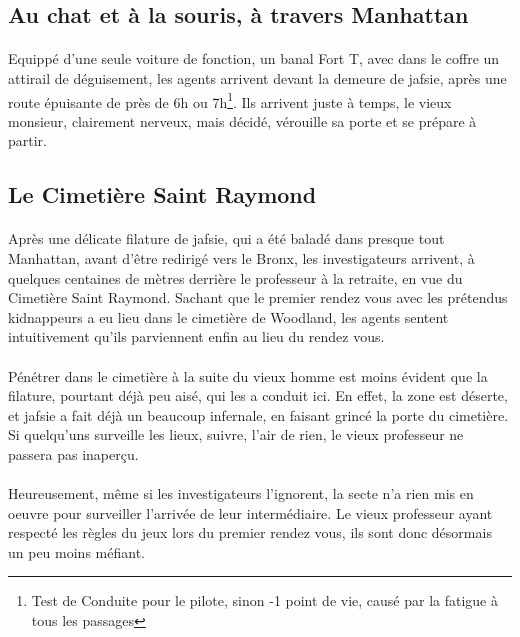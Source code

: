 
\subsection{Au chat et à la souris, à travers Manhattan}

\paragraph{} Equippé d'une seule voiture de fonction, un banal Fort T, avec dans le coffre un attirail de déguisement, les 
agents arrivent devant la demeure de \gls{jafsie}, après une route épuisante de près de 6h ou 7h\footnote{Test de Conduite pour 
le pilote, sinon -1 point de vie, causé par la fatigue à tous les passages}. Ils arrivent juste à temps, le vieux monsieur, 
clairement nerveux, mais décidé, vérouille sa porte et se prépare à partir.

\subsection{Le Cimetière Saint Raymond}

\paragraph{} Après une délicate filature de \gls{jafsie}, qui a été baladé dans presque tout Manhattan, avant d'être redirigé 
vers le Bronx, les investigateurs arrivent, à quelques centaines de mètres derrière le professeur à la retraite, en vue du 
Cimetière Saint Raymond. Sachant que le premier rendez vous avec les prétendus kidnappeurs a eu lieu dans le cimetière de Woodland,
les agents sentent intuitivement qu'ils parviennent enfin au lieu du rendez vous.

\paragraph{} Pénétrer dans le cimetière à la suite du vieux homme est moins évident que la filature, pourtant déjà peu aisé, qui
les a conduit ici. En effet, la zone est déserte, et \gls{jafsie} a fait déjà un beaucoup infernale, en faisant grincé la porte du 
cimetière. Si quelqu'uns surveille les lieux, suivre, l'air de rien, le vieux professeur ne passera pas inaperçu. 

\paragraph{} Heureusement, même si les investigateurs l'ignorent, la secte n'a rien mis en oeuvre pour surveiller l'arrivée de 
leur intermédiaire. Le vieux professeur ayant respecté les règles du jeux lors du premier rendez vous, ils sont donc désormais un 
peu moins méfiant.

